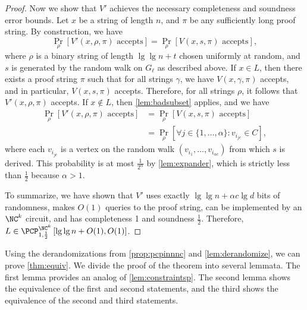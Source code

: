 \documentclass[]{article}
\newcommand{\PCPcs}[5]{\PCP^{#1}_{#2, #3}\left[#4, #5\right]}
\begin{document}
\begin{proof}
  Now we show that $V'$ achieves the necessary completeness and soundness error bounds.
  Let $x$ be a string of length $n$, and $\pi$ be any sufficiently long proof string.
  By construction, we have
  \begin{equation*}
    \Pr_\rho[V'(x, \rho, \pi) \text{ accepts}] = \Pr_\rho[V(x, s, \pi) \text{ accepts}],
  \end{equation*}
  where $\rho$ is a binary string of length $\lg \lg n + t$ chosen uniformly at random, and $s$ is generated by the random walk on $G_\ell$ as described above.
  If $x \in L$, then there exists a proof string $\pi$ such that for all strings $\gamma$, we have $V(x, \gamma, \pi)$ accepts, and in particular, $V(x, s, \pi)$ accepts.
  Therefore, for all strings $\rho$, it follows that $V'(x, \rho, \pi)$ accepts.
  If $x \notin L$, then \autoref{lem:badsubset} applies, and we have
  \begin{align*}
    \Pr_\rho[V'(x, \rho, \pi) \text{ accepts}] & = \Pr_\rho[V(x, s, \pi) \text{ accepts}] \\
    & = \Pr_\rho[\forall j \in \{1, \dotsc, \alpha\} \colon v_{i_{jc}} \in C],
  \end{align*}
  where each $v_{i_{jc}}$ is a vertex on the random walk $(v_{i_1}, \dotsc, v_{i_{\alpha c}})$ from which $s$ is derived.
  This probability is at most $\frac{1}{2^\alpha}$ by \autoref{lem:expander}, which is strictly less than $\frac{1}{2}$ because $\alpha > 1$.

  To summarize, we have shown that $V'$ uses exactly $\lg \lg n + \alpha c \lg d$ bits of randomness, makes $O(1)$ queries to the proof string, can be implemented by an $\NC^k$ circuit, and has completeness 1 and soundness $\frac{1}{2}$.
  Therefore, $L \in \PCPcs{\NC^k}{1}{\frac{1}{2}}{\lg \lg n + O(1)}{O(1)}$.
\end{proof}

Using the derandomizations from \autoref{prop:pcpinnnc} and \autoref{lem:derandomize}, we can prove \autoref{thm:equiv}.
We divide the proof of the theorem into several lemmata.
The first lemma provides an \NC{} analog of \autoref{lem:constraintsp}.
The second lemma shows the equivalence of the first and second statements, and the third shows the equivalence of the second and third statements.
\end{document}
